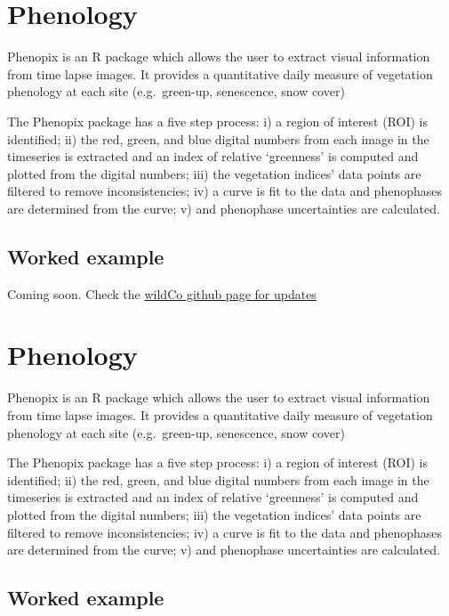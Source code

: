 \documentclass[]{book}
\begin{document}
\chapter{Phenology}\label{phenology}

Phenopix is an R package which allows the user to extract visual
information from time lapse images. It provides a quantitative daily
measure of vegetation phenology at each site (e.g.~green-up, senescence,
snow cover)

The Phenopix package has a five step process: i) a region of interest
(ROI) is identified; ii) the red, green, and blue digital numbers from
each image in the timeseries is extracted and an index of relative
`greenness' is computed and plotted from the digital numbers; iii) the
vegetation indices' data points are filtered to remove inconsistencies;
iv) a curve is fit to the data and phenophases are determined from the
curve; v) and phenophase uncertainties are calculated.

\section{Worked example}\label{worked-example}

Coming soon. Check the \href{https://github.com/WildCoLab}{wildCo github
page for updates}

\chapter{Phenology}\label{phenology-1}

Phenopix is an R package which allows the user to extract visual
information from time lapse images. It provides a quantitative daily
measure of vegetation phenology at each site (e.g.~green-up, senescence,
snow cover)

The Phenopix package has a five step process: i) a region of interest
(ROI) is identified; ii) the red, green, and blue digital numbers from
each image in the timeseries is extracted and an index of relative
`greenness' is computed and plotted from the digital numbers; iii) the
vegetation indices' data points are filtered to remove inconsistencies;
iv) a curve is fit to the data and phenophases are determined from the
curve; v) and phenophase uncertainties are calculated.

\section{Worked example}\label{worked-example-1}
\end{document}
